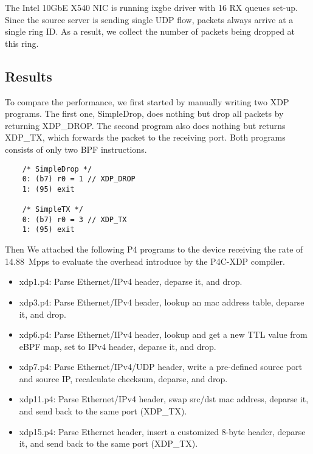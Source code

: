 The Intel 10GbE X540 NIC is running ixgbe driver with 16 RX queues
set-up. Since the source server is sending single UDP flow, packets
always arrive at a single ring ID.  As a result, we collect the number
of packets being dropped at this ring.

\subsection{Results}
To compare the performance, we first started by manually writing two
XDP programs. The first one, SimpleDrop, does nothing but drop all packets by
returning XDP\_DROP. The second program also does nothing but returns
XDP\_TX, which forwards the packet to the receiving port.  Both programs
consists of only two BPF instructions.

{\small
\begin{verbatim}
    /* SimpleDrop */
    0: (b7) r0 = 1 // XDP_DROP
    1: (95) exit

    /* SimpleTX */
    0: (b7) r0 = 3 // XDP_TX
    1: (95) exit
\end{verbatim}
}
Then We attached the following P4 programs to the device receiving the
rate of 14.88~Mpps to evaluate the overhead introduce by the P4C-XDP
compiler.
\begin{itemize}
\item xdp1.p4: Parse Ethernet/IPv4 header, deparse it, and drop.
\item xdp3.p4: Parse Ethernet/IPv4 header, lookup an mac address
table, deparse it, and drop.
\item xdp6.p4: Parse Ethernet/IPv4 header, lookup and get a new TTL value
from eBPF map, set to IPv4 header, deparse it, and drop.
\item xdp7.p4: Parse Ethernet/IPv4/UDP header, write a pre-defined source port
and source IP, recalculate checksum, deparse, and drop.
\item xdp11.p4: Parse Ethernet/IPv4 header, swap src/dst mac address,
deparse it, and send back to the same port (XDP\_TX).
\item xdp15.p4: Parse Ethernet header, insert a customized 8-byte header,
deparse it, and send back to the same port (XDP\_TX).
\end{itemize}

